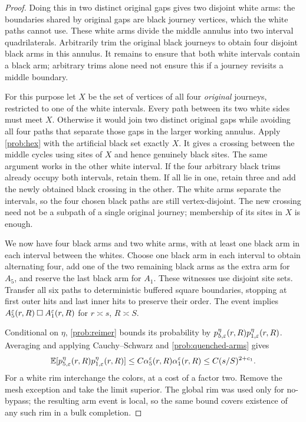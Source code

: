 \begin{proof}
Doing this in two distinct original gaps gives two disjoint white arms:
the boundaries shared by original gaps are black journey vertices, which
the white paths cannot use.  These white arms divide the middle annulus
into two interval quadrilaterals.  Arbitrarily trim the original black
journeys to obtain four disjoint black arms in this annulus.  It remains
to ensure that both white intervals contain a black arm; arbitrary trims
alone need not ensure this if a journey revisits a middle boundary.

For this purpose let $X$ be the set of vertices of all four \emph{original}
journeys, restricted to one of the white intervals.  Every path between
its two white sides must meet $X$.  Otherwise it would join two distinct
original gaps while avoiding all four paths that separate those gaps in
the larger working annulus.  Apply \cref{prob:hex} with the artificial
black set exactly $X$.  It gives a crossing between the middle cycles
using sites of $X$ and hence genuinely black sites.  The same argument
works in the other white interval.  If the four arbitrary black trims
already occupy both intervals, retain them.  If all lie in one, retain
three and add the newly obtained black crossing in the other.  The
white arms separate the intervals, so the four chosen black paths are
still vertex-disjoint.  The new crossing need not be a subpath of a
single original journey; membership of its sites in $X$ is enough.

We now have four black arms and two white arms, with at least one black
arm in each interval between the whites.  Choose one black arm in each
interval to obtain alternating four, add one of the two remaining black
arms as the extra arm for $A_5$, and reserve the last black arm for
$A_1$.  These witnesses use disjoint site sets.  Transfer all six paths
to deterministic buffered square boundaries, stopping at first outer
hits and last inner hits to preserve their order.  The event implies
$A_5^\varepsilon(r,R)\mathbin\square A_1^\varepsilon(r,R)$ for
$r\asymp s$, $R\asymp S$.

Conditional on $\eta$, \cref{prob:reimer} bounds its probability by
$p_{5,\varepsilon}^\eta(r,R)p_{1,\varepsilon}^\eta(r,R)$.  Averaging and applying
Cauchy--Schwarz
and \eqref{prob:quenched-arms} gives
\[
 \mathbb E[p_{5,\varepsilon}^\eta(r,R)p_{1,\varepsilon}^\eta(r,R)]
 \le C\alpha_5^\varepsilon(r,R)\alpha_1^\varepsilon(r,R)
 \le C(s/S)^{2+c_1}.
\]
For a white rim interchange the colors, at a cost of a factor two.
Remove the mesh exception and take the limit superior.  The global rim
was used only for no-bypass; the resulting arm event is local, so the
same bound covers existence of any such rim in a bulk completion.
\end{proof}

